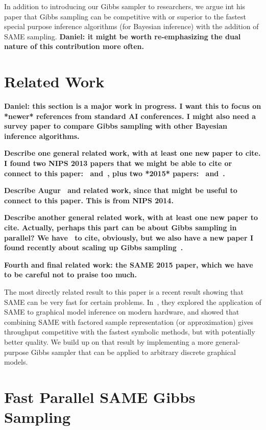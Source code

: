 \documentclass{article} %
\begin{document}
In addition to introducing our Gibbs sampler to researchers, we argue int his paper that Gibbs
sampling can be competitive with or superior to the fastest special purpose inference algorithms
(for Bayesian inference) with the addition of SAME sampling. \textbf{Daniel: it might be worth
re-emphasizing the dual nature of this contribution more often.}


\section{Related Work}\label{sec:related_work}

\textbf{Daniel: this section is a major work in progress. I want this to focus on *newer* references
from standard AI conferences. I might also need a survey paper to compare Gibbs sampling with other
Bayesian inference algorithms.}

\textbf{Describe one general related work, with at least one new paper to cite. I found two NIPS
2013 papers that we might be able to cite or connect to this paper:~\citep{Johnson2013}
and~\cite{Hazan2013}, plus two *2015* papers:~\cite{Tripuraneni2015} and~\cite{DeSa2015}.}

\textbf{Describe Augur~\citep{augur2014} and related work, since that might be useful to connect to
this paper. This is from NIPS 2014.}

\textbf{Describe another general related work, with at least one new paper to cite. Actually,
perhaps this part can be about Gibbs sampling in parallel? We have~\cite{Gonzalez2011} to cite,
obviously, but we also have a new paper I found recently about scaling up Gibbs
sampling~\cite{Zhang2013}.}

\textbf{Fourth and final related work: the SAME 2015 paper, which we have to be careful not to
praise too much.}

The most directly related result to this paper is a recent result showing that SAME can be very fast
for certain problems. In~\citep{SAME2015}, they explored the application of SAME to graphical model
inference on modern hardware, and showed that combining SAME with factored sample representation
(or approximation) gives throughput competitive with the fastest symbolic methods, but with
potentially better quality. We build up on that result by implementing a more general-purpose Gibbs
sampler that can be applied to arbitrary discrete graphical models.






\section{Fast Parallel SAME Gibbs Sampling}\label{sec:same}
\end{document}
